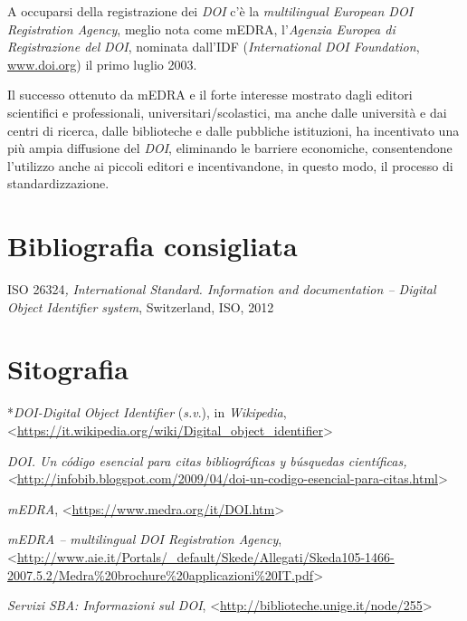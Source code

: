 \documentclass[
  b5paper,
  twoside,
  11pt,
  chapterprefix=false,
  bibliography=totocnumbered,
  listof=flat]{scrbook}
\begin{document}
A occuparsi della registrazione dei \emph{DOI} c'è la \emph{multilingual European
DOI Registration Agency}, meglio nota come mEDRA, l'\emph{Agenzia Europea di
Registrazione del} \emph{DOI}, nominata dall'IDF (\emph{International DOI
Foundation}, \href{http://www.doi.org/}{{www.doi.org}}) il primo
luglio 2003.

Il successo ottenuto da mEDRA e il forte interesse mostrato dagli
editori scientifici e professionali, universitari/scolastici, ma anche
dalle università e dai centri di ricerca, dalle biblioteche e dalle
pubbliche istituzioni, ha incentivato una più ampia diffusione del
\emph{DOI}, eliminando le barriere economiche, consentendone l'utilizzo anche
ai piccoli editori e incentivandone, in questo modo, il processo di
standardizzazione.

\hypertarget{bibliografia-consigliata-7}{%
\section*{Bibliografia consigliata}\label{bibliografia-consigliata-7}}

ISO 26324\emph{,} \emph{International Standard. Information and documentation --
Digital Object Identifier system}, Switzerland, ISO, 2012

\hypertarget{sitografia-9}{%
\section*{Sitografia}\label{sitografia-9}}

*\emph{DOI-Digital Object Identifier} (\emph{s.v}.), in \emph{Wikipedia},
\textless{}{\url{https://it.wikipedia.org/wiki/Digital_object_identifier}\textgreater{}}

\emph{DOI. Un código esencial para citas bibliográficas y búsquedas
científicas,
\textless{}}{\url{http://infobib.blogspot.com/2009/04/doi-un-codigo-esencial-para-citas.html}\textgreater{}}

\emph{mEDRA}, \textless{}{\url{https://www.medra.org/it/DOI.htm}\textgreater{}}

\emph{mEDRA -- multilingual DOI Registration Agency},
\textless{}{\url{http://www.aie.it/Portals/_default/Skede/Allegati/Skeda105-1466-2007.5.2/Medra\%20brochure\%20applicazioni\%20IT.pdf}\textgreater{}}

\emph{Servizi SBA: Informazioni sul DOI},
\textless{}{\url{http://biblioteche.unige.it/node/255}\textgreater{}}
\end{document}
